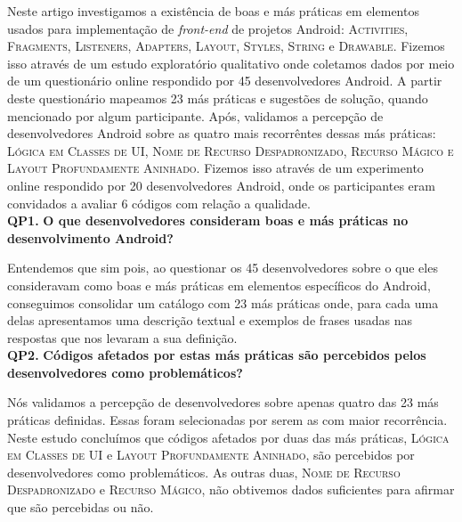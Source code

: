 Neste artigo investigamos a existência de boas e más práticas em elementos usados para implementação de \textit{front-end} de projetos Android: \textsc{Activities}, \textsc{Fragments}, \textsc{Listeners}, \textsc{Adapters}, \textsc{Layout}, \textsc{Styles}, \textsc{String} e \textsc{Drawable}. Fizemos isso através de um estudo exploratório qualitativo onde coletamos dados por meio de um questionário online respondido por 45 desenvolvedores Android. A partir deste questionário mapeamos 23 más práticas e sugestões de solução, quando mencionado por algum participante. Após, validamos a percepção de desenvolvedores Android sobre as quatro mais recorrêntes dessas más práticas: \textsc{Lógica em Classes de UI}, \textsc{Nome de Recurso Despadronizado}, \textsc{Recurso Mágico e Layout Profundamente Aninhado}. Fizemos isso através de um experimento online respondido por 20 desenvolvedores Android, onde os participantes eram convidados a avaliar 6 códigos com relação a qualidade. \\

\textbf{QP1.} \textbf{O que desenvolvedores consideram boas e más práticas no desenvolvimento Android?} 

Entendemos que sim pois, ao questionar os 45 desenvolvedores sobre o que eles consideravam como boas e más práticas em elementos específicos do Android, conseguimos consolidar um catálogo com 23 más práticas onde, para cada uma delas apresentamos uma descrição textual e exemplos de frases usadas nas respostas que nos levaram a sua definição. \\

\textbf{QP2.} \textbf{Códigos afetados por estas más práticas são percebidos pelos desenvolvedores como problemáticos?}

Nós validamos a percepção de desenvolvedores sobre apenas quatro das 23 más práticas definidas. Essas foram selecionadas por serem as com maior recorrência. Neste estudo concluímos que códigos afetados por duas das más práticas, \textsc{Lógica em Classes de UI} e \textsc{Layout Profundamente Aninhado}, são percebidos por desenvolvedores como problemáticos. As outras duas, \textsc{Nome de Recurso Despadronizado} e \textsc{Recurso Mágico}, não obtivemos dados suficientes para afirmar que são percebidas ou não.



